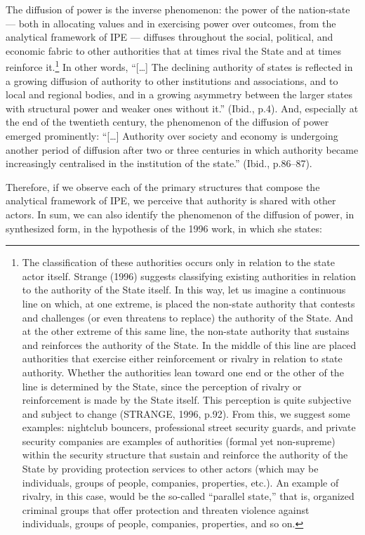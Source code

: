 The diffusion of power is the inverse phenomenon: the power of the nation-state --- both in allocating values and in exercising power over outcomes, from the analytical framework of IPE --- diffuses throughout the social, political, and economic fabric to other authorities that at times rival the State and at times reinforce it.\footnote{The classification of these authorities occurs only in relation to the state actor itself. Strange (1996) suggests classifying existing authorities in relation to the authority of the State itself. In this way, let us imagine a continuous line on which, at one extreme, is placed the non-state authority that contests and challenges (or even threatens to replace) the authority of the State. And at the other extreme of this same line, the non-state authority that sustains and reinforces the authority of the State. In the middle of this line are placed authorities that exercise either reinforcement or rivalry in relation to state authority. Whether the authorities lean toward one end or the other of the line is determined by the State, since the perception of rivalry or reinforcement is made by the State itself. This perception is quite subjective and subject to change (STRANGE, 1996, p.92). From this, we suggest some examples: nightclub bouncers, professional street security guards, and private security companies are examples of authorities (formal yet non-supreme) within the security structure that sustain and reinforce the authority of the State by providing protection services to other actors (which may be individuals, groups of people, companies, properties, etc.). An example of rivalry, in this case, would be the so-called ``parallel state,'' that is, organized criminal groups that offer protection and threaten violence against individuals, groups of people, companies, properties, and so on.} In other words, ``{[}\ldots{]} The declining authority of states is reflected in a growing diffusion of authority to other institutions and associations, and to local and regional bodies, and in a growing asymmetry between the larger states with structural power and weaker ones without it.'' (Ibid., p.4). And, especially at the end of the twentieth century, the phenomenon of the diffusion of power emerged prominently: ``{[}\ldots{]} Authority over society and economy is undergoing another period of diffusion after two or three centuries in which authority became increasingly centralised in the institution of the state.'' (Ibid., p.86--87).

Therefore, if we observe each of the primary structures that compose the analytical framework of IPE, we perceive that authority is shared with other actors. In sum, we can also identify the phenomenon of the diffusion of power, in synthesized form, in the hypothesis of the 1996 work, in which she states:

